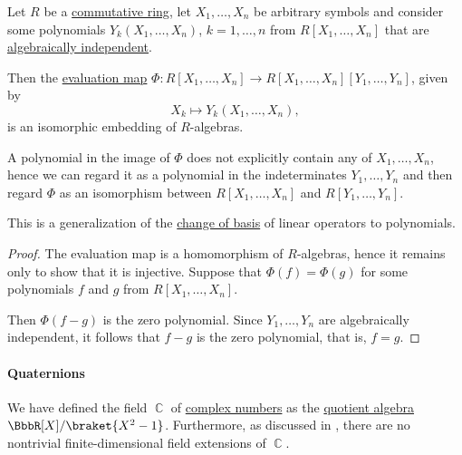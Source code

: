 \begin{proposition}\label{thm:change_of_polynomial_basis}
  Let \( R \) be a \hyperref[def:ring/commutative]{commutative ring}, let \( X_1, \ldots, X_n \) be arbitrary symbols and consider some polynomials \( Y_k(X_1, \ldots, X_n) \), \( k = 1, \ldots, n \) from \( R[X_1, \ldots, X_n] \) that are \hyperref[def:algebraic_dependence]{algebraically independent}.

  Then the \hyperref[thm:polynomial_algebra_universal_property]{evaluation map} \( \Phi: R[X_1, \ldots, X_n] \to R[X_1, \ldots, X_n][Y_1, \ldots, Y_n] \), given by
  \begin{equation*}
    X_k \mapsto Y_k(X_1, \ldots, X_n),
  \end{equation*}
  is an isomorphic embedding of \( R \)-algebras.
\end{proposition}
\begin{comments}
  \item A polynomial in the image of \( \Phi \) does not explicitly contain any of \( X_1, \ldots, X_n \), hence we can regard it as a polynomial in the indeterminates \( Y_1, \ldots, Y_n \) and then regard \( \Phi \) as an isomorphism between \( R[X_1, \ldots, X_n] \) and \( R[Y_1, \ldots, Y_n] \).

  \item This is a generalization of the \hyperref[con:change_of_basis]{change of basis} of linear operators to polynomials.
\end{comments}
\begin{proof}
  The evaluation map is a homomorphism of \( R \)-algebras, hence it remains only to show that it is injective. Suppose that \( \Phi(f) = \Phi(g) \) for some polynomials \( f \) and \( g \) from \( R[X_1, \ldots, X_n] \).

  Then \( \Phi(f - g) \) is the zero polynomial. Since \( Y_1, \ldots, Y_n \) are algebraically independent, it follows that \( f - g \) is the zero polynomial, that is, \( f = g \).
\end{proof}

\paragraph{Quaternions}

We have defined the field \( \BbbC \) of \hyperref[def:complex_numbers]{complex numbers} as the \hyperref[def:algebra_over_ring/quotient]{quotient algebra} \( \BbbR[X] / \braket{ X^2 - 1 } \). Furthermore, as discussed in , there are no nontrivial finite-dimensional field extensions of \( \BbbC \).

